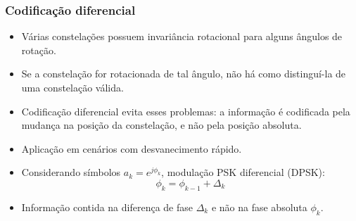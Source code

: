 \begin{frame}
	\frametitle{Codificação diferencial}

	\begin{itemize}	   
	    \item Várias constelações possuem invariância rotacional para alguns ângulos de rotação.
	    \item Se a constelação for rotacionada de tal ângulo, não há como distinguí-la de uma constelação válida.
	    \item Codificação diferencial evita esses problemas: a informação é codificada pela mudança na posição da constelação, e não pela posição absoluta.
	    \item Aplicação em cenários com desvanecimento rápido.
	    \item Considerando símbolos $a_k = e^{j\phi_k}$, modulação PSK diferencial (DPSK):
	    \begin{equation*}
		   \phi_k = \phi_{k-1} + \Delta_k
	    \end{equation*}
	    \item Informação contida na diferença de fase $\Delta_k$ e não na fase absoluta $\phi_k$.
	\end{itemize}	 

\end{frame}

